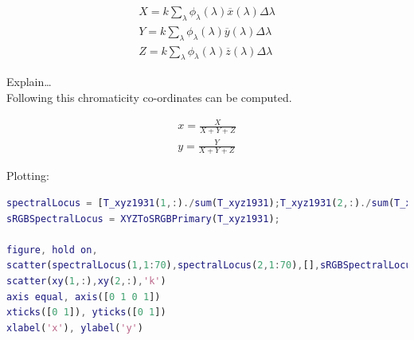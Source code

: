 \begin{subequations}
\begin{align}
X=k \sum_{\lambda} \phi_{\lambda}(\lambda) \overline{x}(\lambda) \Delta \lambda \\ 
Y=k \sum_{\lambda} \phi_{\lambda}(\lambda) \overline{y}(\lambda) \Delta \lambda \\ 
Z=k \sum_{\lambda} \phi_{\lambda}(\lambda) \overline{z}(\lambda) \Delta \lambda
\end{align}
\end{subequations}

Explain\dots \\
Following this chromaticity co-ordinates can be computed.

\begin{subequations}
\begin{align}
x=\frac{X}{X+Y+Z} \\
y=\frac{Y}{X+Y+Z} 
\end{align}
\end{subequations}




Plotting: 

\begin{lstlisting}[language=MATLAB]
spectralLocus = [T_xyz1931(1,:)./sum(T_xyz1931);T_xyz1931(2,:)./sum(T_xyz1931)];
sRGBSpectralLocus = XYZToSRGBPrimary(T_xyz1931);

figure, hold on, 
scatter(spectralLocus(1,1:70),spectralLocus(2,1:70),[],sRGBSpectralLocus(:,1:70)','filled')
scatter(xy(1,:),xy(2,:),'k')
axis equal, axis([0 1 0 1])
xticks([0 1]), yticks([0 1])
xlabel('x'), ylabel('y')
\end{lstlisting}

